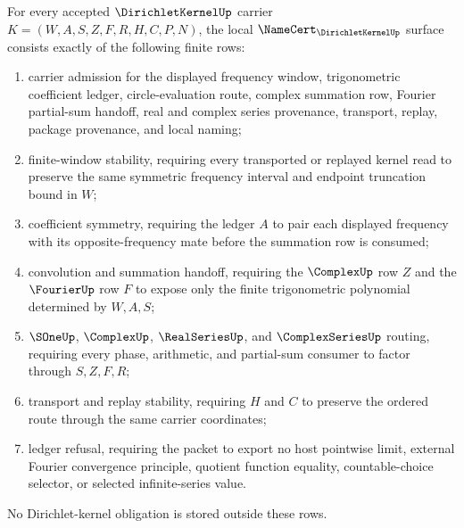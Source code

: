 \begin{theorem}\label{thm:dirichlet-kernel-namecert-obligations}
For every accepted $\DirichletKernelUp$ carrier $K=(W,A,S,Z,F,R,H,C,P,N)$, the local $\NameCert_{\DirichletKernelUp}$ surface consists exactly of the following finite rows:
\begin{enumerate}
\item carrier admission for the displayed frequency window, trigonometric coefficient ledger, circle-evaluation route, complex summation row, Fourier partial-sum handoff, real and complex series provenance, transport, replay, package provenance, and local naming;
\item finite-window stability, requiring every transported or replayed kernel read to preserve the same symmetric frequency interval and endpoint truncation bound in $W$;
\item coefficient symmetry, requiring the ledger $A$ to pair each displayed frequency with its opposite-frequency mate before the summation row is consumed;
\item convolution and summation handoff, requiring the $\ComplexUp$ row $Z$ and the $\FourierUp$ row $F$ to expose only the finite trigonometric polynomial determined by $W,A,S$;
\item $\SOneUp$, $\ComplexUp$, $\RealSeriesUp$, and $\ComplexSeriesUp$ routing, requiring every phase, arithmetic, and partial-sum consumer to factor through $S,Z,F,R$;
\item transport and replay stability, requiring $H$ and $C$ to preserve the ordered route through the same carrier coordinates;
\item ledger refusal, requiring the packet to export no host pointwise limit, external Fourier convergence principle, quotient function equality, countable-choice selector, or selected infinite-series value.
\end{enumerate}
No Dirichlet-kernel obligation is stored outside these rows.
\end{theorem}
